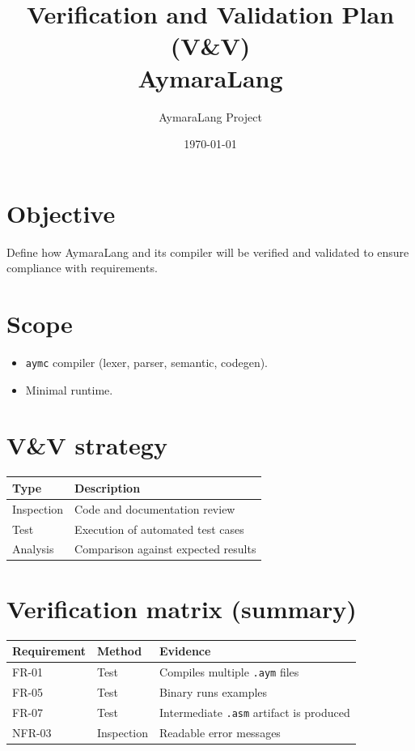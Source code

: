 \documentclass[11pt,a4paper]{article}
\title{Verification and Validation Plan (V\&V)\\AymaraLang}
\author{AymaraLang Project}
\date{\today}
\begin{document}
\maketitle

\section{Objective}
Define how AymaraLang and its compiler will be verified and validated to ensure compliance with requirements.

\section{Scope}
\begin{itemize}
    \item \texttt{aymc} compiler (lexer, parser, semantic, codegen).
    \item Minimal runtime.
\end{itemize}

\section{V\&V strategy}
\begin{longtable}{@{}p{3cm}p{10cm}@{}}
\toprule
\textbf{Type} & \textbf{Description} \\ \midrule
Inspection & Code and documentation review \\
Test & Execution of automated test cases \\
Analysis & Comparison against expected results \\ \bottomrule
\end{longtable}

\section{Verification matrix (summary)}
\begin{longtable}{@{}p{3cm}p{3cm}p{7cm}@{}}
\toprule
\textbf{Requirement} & \textbf{Method} & \textbf{Evidence} \\ \midrule
FR-01 & Test & Compiles multiple \texttt{.aym} files \\
FR-05 & Test & Binary runs examples \\
FR-07 & Test & Intermediate \texttt{.asm} artifact is produced \\
NFR-03 & Inspection & Readable error messages \\ \bottomrule
\end{longtable}
\end{document}
